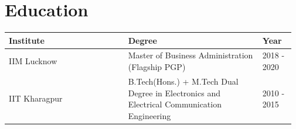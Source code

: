 \section{Education}
\raggedleft
\begin{tabularx}{.97\textwidth}{|>{\centering\arraybackslash}m{0.40\linewidth}|>{\centering\arraybackslash}m{0.45\linewidth}|>{\centering\arraybackslash}m{0.117\linewidth}|}
    \hline
    \rowcolor[gray]{0.9}
    \small Institute & \small Degree & \small Year \\
    \hline
    \small IIM Lucknow & \small Master of Business Administration (Flagship PGP)& \small 2018 - 2020 \\
    \hline
    \small IIT Kharagpur & \small B.Tech(Hons.) + M.Tech Dual Degree in Electronics and Electrical Communication Engineering & \small 2010 - 2015 \\
    \hline
\end{tabularx}
